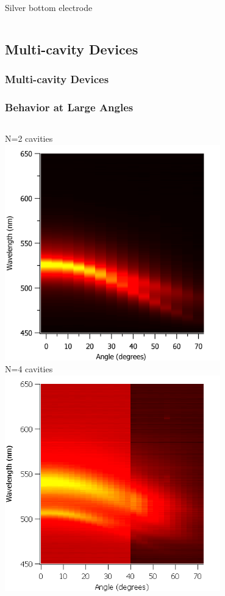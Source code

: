 \documentclass{beamer}
\begin{document}
\begin{frame}
\begin{columns}
\begin{column}{0.5\textwidth}
					Silver bottom electrode
				\end{column}


            \end{columns}

        \end{frame}
        
    \subsection{Multi-cavity Devices}
        \begin{frame}
            \frametitle{Multi-cavity Devices}
        \end{frame}
        
        \begin{frame}
            \frametitle{Behavior at Large Angles}
            \begin{columns}
				\begin{column}{0.5\textwidth}
					\centering
					N=2 cavities\\
					\includegraphics[width=0.7\textwidth]{images/n2_heatmap.png}\\
					N=4 cavities\\
					\includegraphics[width=0.7\textwidth]{images/n4_heatmap.png}

\end{column}
\end{columns}
\end{frame}
\end{document}
